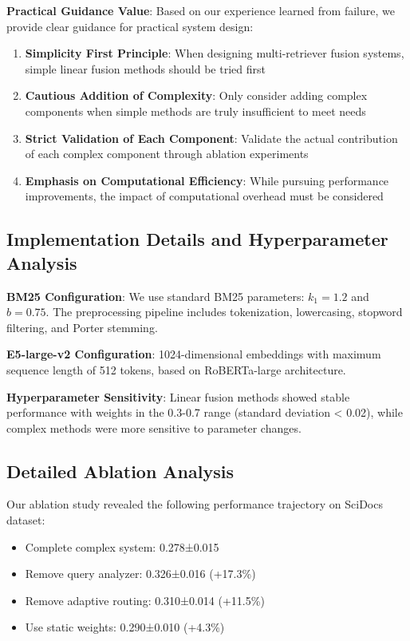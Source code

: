 \documentclass[letterpaper]{article} %
\begin{document}
\textbf{Practical Guidance Value}:
Based on our experience learned from failure, we provide clear guidance for practical system design:
\begin{enumerate}
\item \textbf{Simplicity First Principle}: When designing multi-retriever fusion systems, simple linear fusion methods should be tried first
\item \textbf{Cautious Addition of Complexity}: Only consider adding complex components when simple methods are truly insufficient to meet needs
\item \textbf{Strict Validation of Each Component}: Validate the actual contribution of each complex component through ablation experiments
\item \textbf{Emphasis on Computational Efficiency}: While pursuing performance improvements, the impact of computational overhead must be considered
\end{enumerate}

\subsection{Implementation Details and Hyperparameter Analysis}

\textbf{BM25 Configuration}: We use standard BM25 parameters: $k_1 = 1.2$ and $b = 0.75$. The preprocessing pipeline includes tokenization, lowercasing, stopword filtering, and Porter stemming.

\textbf{E5-large-v2 Configuration}: 1024-dimensional embeddings with maximum sequence length of 512 tokens, based on RoBERTa-large architecture.

\textbf{Hyperparameter Sensitivity}: Linear fusion methods showed stable performance with weights in the 0.3-0.7 range (standard deviation < 0.02), while complex methods were more sensitive to parameter changes.

\subsection{Detailed Ablation Analysis}

Our ablation study revealed the following performance trajectory on SciDocs dataset:
\begin{itemize}
\item Complete complex system: 0.278±0.015
\item Remove query analyzer: 0.326±0.016 (+17.3\%)
\item Remove adaptive routing: 0.310±0.014 (+11.5\%)
\item Use static weights: 0.290±0.010 (+4.3\%)
\end{itemize}
\end{document}
